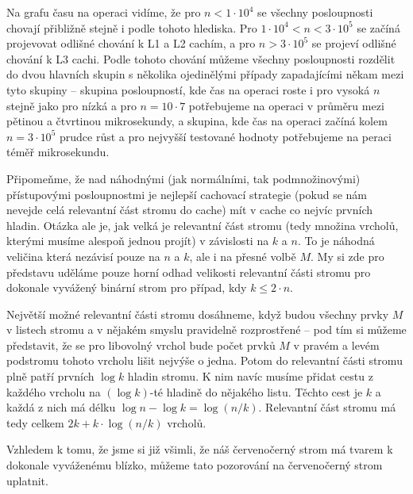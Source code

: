 Na grafu času na operaci vidíme, že pro $n<1\cdot10^4$ se všechny posloupnosti
chovají přibližně stejně i podle tohoto hlediska. Pro $1\cdot10^4 < n < 3\cdot
10^5$ se začíná projevovat odlišné chování k L1 a L2 cachím, a pro $n > 3\cdot
10^5$ se projeví odlišné chování k L3 cachi. Podle tohoto chování můžeme
všechny posloupnosti rozdělit do dvou hlavních skupin s několika ojedinělými
případy zapadajícími někam mezi tyto skupiny -- skupina posloupností, kde čas
na operaci roste i pro vysoká $n$ stejně jako pro nízká a pro $n=10\cdot 7$
potřebujeme na operaci v průměru mezi pětinou a čtvrtinou mikrosekundy, a
skupina, kde čas na operaci začíná kolem $n=3\cdot 10^5$ prudce růst a pro
nejvyšší testované hodnoty potřebujeme na  
peraci téměř mikrosekundu.

Připomeňme, že nad náhodnými (jak normálními, tak podmnožinovými) přístupovými posloupnostmi je nejlepší cachovací strategie (pokud se nám nevejde celá relevantní část stromu do cache) mít v cache co nejvíc prvních hladin. Otázka ale je, jak velká je relevantní část stromu (tedy množina vrcholů, kterými musíme alespoň jednou projít) v závislosti na $k$ a $n$. To je náhodná veličina která nezávisí pouze na $n$ a $k$, ale i na přesné volbě $M$. My si zde pro představu uděláme pouze horní odhad velikosti relevantní části stromu pro dokonale vyvážený binární strom pro případ, kdy $k\leq2\cdot n$. 

Největší možné relevantní části stromu dosáhneme, když budou všechny prvky $M$ v listech stromu a v nějakém smyslu pravidelně rozprostřené -- pod tím si můžeme představit, že se pro libovolný vrchol bude počet prvků $M$ v pravém a levém podstromu tohoto vrcholu lišit nejvýše o jedna. Potom do relevantní části stromu plně patří prvních $\log k$ hladin stromu. K nim navíc musíme přidat cestu z každého vrcholu na $(\log k)$-té hladině do nějakého listu. Těchto cest je $k$ a každá z nich má délku $\log n - \log k = \log (n/k)$. Relevantní část stromu  má tedy celkem $2k + k\cdot \log (n/k)$ vrcholů.

Vzhledem k tomu, že jsme si již všimli, že náš červenočerný strom má tvarem k dokonale vyváženému blízko, můžeme tato pozorování na červenočerný strom uplatnit.

